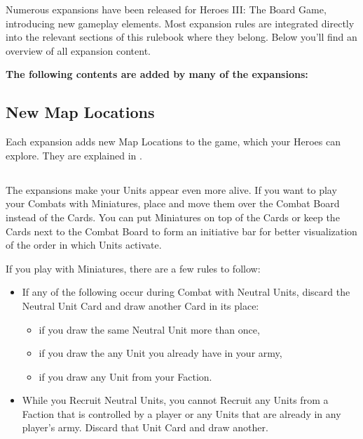 
Numerous expansions have been released for Heroes III: The Board Game, introducing new gameplay elements.
Most expansion rules are integrated directly into the relevant sections of this rulebook where they belong.
Below you'll find an overview of all expansion content.

\vspace*{1em}

\textbf{The following contents are added by many of the expansions:}
\begin{multicols*}{2}
\subsection*{New Map Locations}
Each expansion adds new Map Locations to the game, which your Heroes can explore.
They are explained in .

\subsection*{}
The expansions make your Units appear even more alive.
If you want to play your Combats with Miniatures, place and move them over the Combat Board instead of the Cards.
You can put Miniatures on top of the Cards or keep the Cards next to the Combat Board to form an initiative bar for better visualization of the order in which Units activate.\par
\vspace*{1em}
If you play with Miniatures, there are a few rules to follow:
\begin{itemize}
  \item If any of the following occur during Combat with Neutral Units, discard the Neutral Unit Card and draw another Card in its place:
    \begin{itemize}
      \item if you draw the same Neutral Unit more than once,
      \item if you draw the any Unit you already have in your army,
      \item if you draw any Unit from your Faction.
    \end{itemize}
  \item While you Recruit Neutral Units, you cannot Recruit any Units from a Faction that is controlled by a player or any Units that are already in any player's army.
  Discard that Unit Card and draw another.
\end{itemize}


\end{multicols*}
